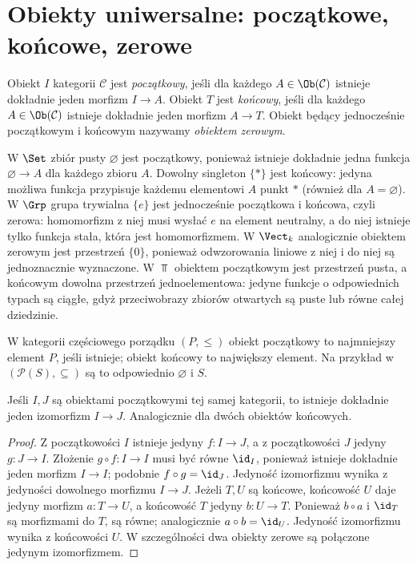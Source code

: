 \providecommand{\atlasref}[2]{#2}
\section{Obiekty uniwersalne: początkowe, końcowe, zerowe}\label{sec:uniwersalne}

\begin{definicja}\label{def:poczatkowy}
Obiekt $I$ kategorii $\mathcal C$ jest \emph{początkowy}, jeśli dla każdego $A\in\Ob(\mathcal C)$ istnieje dokładnie jeden morfizm $I\to A$. Obiekt $T$ jest \emph{końcowy}, jeśli dla każdego $A\in\Ob(\mathcal C)$ istnieje dokładnie jeden morfizm $A\to T$. Obiekt będący jednocześnie początkowym i końcowym nazywamy \emph{obiektem zerowym}.
\end{definicja}

\begin{przyklad}
W $\Set$ zbiór pusty $\varnothing$ jest początkowy, ponieważ istnieje dokładnie jedna funkcja $\varnothing\to A$ dla każdego zbioru $A$. Dowolny singleton $\{*\}$ jest końcowy: jedyna możliwa funkcja przypisuje każdemu elementowi $A$ punkt $*$ (również dla $A=\varnothing$). W $\Grp$ grupa trywialna $\{e\}$ jest jednocześnie początkowa i końcowa, czyli zerowa: homomorfizm z niej musi wysłać $e$ na element neutralny, a do niej istnieje tylko funkcja stała, która jest homomorfizmem. W $\Vect_k$ analogicznie obiektem zerowym jest przestrzeń $\{0\}$, ponieważ odwzorowania liniowe z niej i do niej są jednoznacznie wyznaczone. W $\Top$ obiektem początkowym jest przestrzeń pusta, a końcowym dowolna przestrzeń jednoelementowa: jedyne funkcje o odpowiednich typach są ciągłe, gdyż przeciwobrazy zbiorów otwartych są puste lub równe całej dziedzinie.
\end{przyklad}

\begin{przyklad}
W kategorii częściowego porządku $(P,\leq)$ obiekt początkowy to najmniejszy element $P$, jeśli istnieje; obiekt końcowy to największy element. Na przykład w $(\mathcal P(S),\subseteq)$ są to odpowiednio $\varnothing$ i $S$.
\end{przyklad}

\begin{twierdzenie}\label{tw:unique-universal}
Jeśli $I,J$ są obiektami początkowymi tej samej kategorii, to istnieje dokładnie jeden izomorfizm $I\to J$. Analogicznie dla dwóch obiektów końcowych.
\end{twierdzenie}
\begin{proof}
Z początkowości $I$ istnieje jedyny $f:I\to J$, a z początkowości $J$ jedyny $g:J\to I$. Złożenie $g\circ f:I\to I$ musi być równe $\id_I$, ponieważ istnieje dokładnie jeden morfizm $I\to I$; podobnie $f\circ g=\id_J$. Jedyność izomorfizmu wynika z jedyności dowolnego morfizmu $I\to J$. Jeżeli $T,U$ są końcowe, końcowość $U$ daje jedyny morfizm $a:T\to U$, a końcowość $T$ jedyny $b:U\to T$. Ponieważ $b\circ a$ i $\id_T$ są morfizmami do $T$, są równe; analogicznie $a\circ b=\id_U$. Jedyność izomorfizmu wynika z końcowości $U$. W szczególności dwa obiekty zerowe są połączone jedynym izomorfizmem.
\end{proof}

